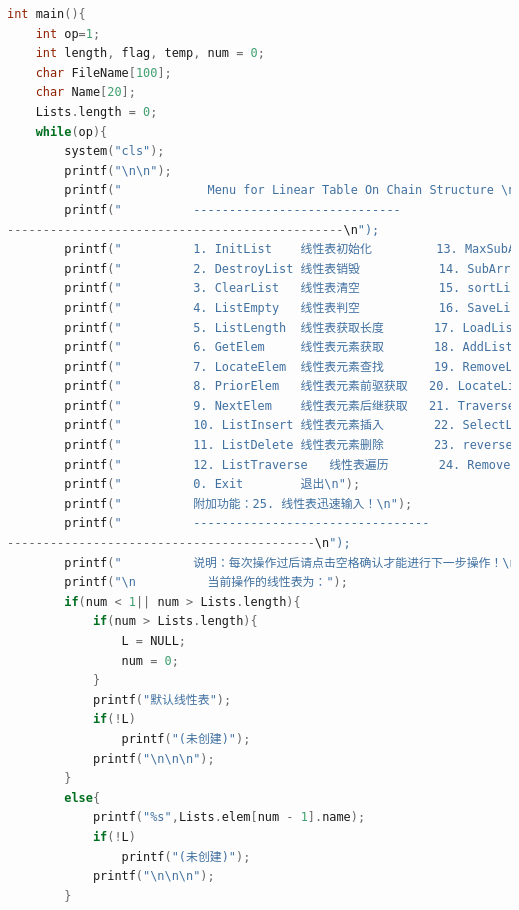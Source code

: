 \documentclass[supercite]{Experimental_Report}
\theoremstyle{definition}
\begin{document}
\begin{lstlisting}[language=c]
int main(){
    int op=1;
    int length, flag, temp, num = 0;
    char FileName[100];
    char Name[20];
    Lists.length = 0;
    while(op){
        system("cls");
        printf("\n\n");
        printf("            Menu for Linear Table On Chain Structure \n");
        printf("          -----------------------------
-----------------------------------------------\n");
        printf("    	  1. InitList    线性表初始化         13. MaxSubArray      线性表最大连续数组和获取\n");
        printf("    	  2. DestroyList 线性表销毁           14. SubArrayNum      线性表指定连续数组和数目\n");
        printf("    	  3. ClearList   线性表清空           15. sortList         线性表排序\n");
        printf("    	  4. ListEmpty   线性表判空           16. SaveList         线性表文件保存\n");
        printf("    	  5. ListLength  线性表获取长度       17. LoadList         线性表文件录入\n");
        printf("    	  6. GetElem     线性表元素获取       18. AddList          多线性表添加\n");
        printf("          7. LocateElem  线性表元素查找       19. RemoveList       多线性表删除\n");
        printf("          8. PriorElem   线性表元素前驱获取   20. LocateList       多线性表位置查找\n");
        printf("          9. NextElem    线性表元素后继获取   21. TraverseList     多线性表遍历\n");
        printf("          10. ListInsert 线性表元素插入       22. SelectList       线性表操作选择\n");
        printf("          11. ListDelete 线性表元素删除       23. reverseList      线性表翻转\n");
        printf("          12. ListTraverse   线性表遍历       24. RemoveNthFromEnd 移除倒数元素\n");
        printf("    	  0. Exit        退出\n");
        printf("          附加功能：25. 线性表迅速输入！\n");
        printf("          ---------------------------------
-------------------------------------------\n");
        printf("          说明：每次操作过后请点击空格确认才能进行下一步操作！\n");
        printf("\n          当前操作的线性表为：");
        if(num < 1|| num > Lists.length){
            if(num > Lists.length){
                L = NULL;
                num = 0;
            }
            printf("默认线性表");
            if(!L)
                printf("(未创建)");
            printf("\n\n\n");
        }
        else{
        	printf("%s",Lists.elem[num - 1].name);
        	if(!L)
                printf("(未创建)");
            printf("\n\n\n");
		}
            

\end{lstlisting}
\end{document}
